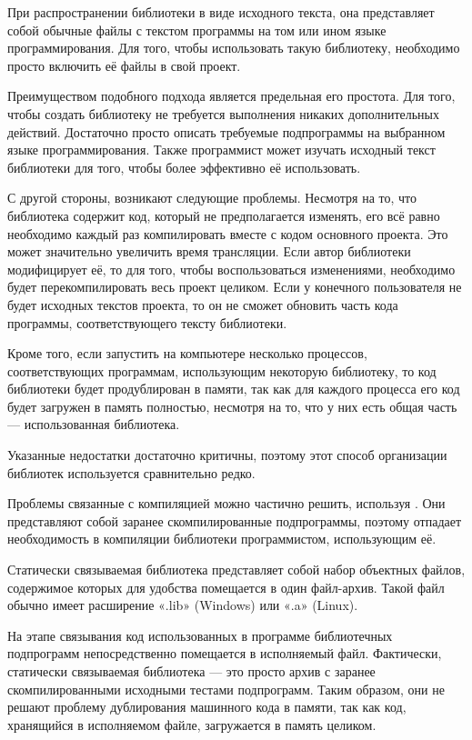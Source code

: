 При распространении библиотеки в виде исходного текста, она
представляет собой обычные файлы с текстом программы на том или ином
языке программирования. Для того, чтобы использовать такую библиотеку,
необходимо просто включить её файлы в свой проект.

Преимуществом подобного подхода является предельная его простота.  Для
того, чтобы создать библиотеку не требуется выполнения никаких
дополнительных действий. Достаточно просто описать требуемые
подпрограммы на выбранном языке программирования. Также программист
может изучать исходный текст библиотеки для того, чтобы более
эффективно её использовать.

С другой стороны, возникают следующие проблемы. Несмотря на то, что
библиотека содержит код, который не предполагается изменять, его всё
равно необходимо каждый раз компилировать вместе с кодом основного
проекта. Это может значительно увеличить время трансляции. Если автор
библиотеки модифицирует её, то для того, чтобы воспользоваться
изменениями, необходимо будет перекомпилировать весь проект
целиком. Если у конечного пользователя не будет исходных текстов
проекта, то он не сможет обновить часть кода программы,
соответствующего тексту библиотеки.

Кроме того, если запустить на компьютере несколько процессов,
соответствующих программам, использующим некоторую библиотеку, то код
библиотеки будет продублирован в памяти, так как для каждого процесса
его код будет загружен в память полностью, несмотря на то, что у них
есть общая часть — использованная библиотека.

Указанные недостатки достаточно критичны, поэтому этот способ
организации библиотек используется сравнительно редко.

Проблемы связанные с компиляцией можно частично решить, используя
. Они представляют собой заранее скомпилированные
подпрограммы, поэтому отпадает необходимость в компиляции библиотеки
программистом, использующим её.

Статически связываемая библиотека представляет собой набор объектных
файлов, содержимое которых для удобства помещается в один файл-архив.
Такой файл обычно имеет расширение «.lib» (Windows) или «.a» (Linux).

На этапе связывания код использованных в программе библиотечных
подпрограмм непосредственно помещается в исполняемый файл. Фактически,
статически связываемая библиотека — это просто архив с заранее
скомпилированными исходными тестами подпрограмм. Таким образом, они не
решают проблему дублирования машинного кода в памяти, так как код,
хранящийся в исполняемом файле, загружается в память целиком.

